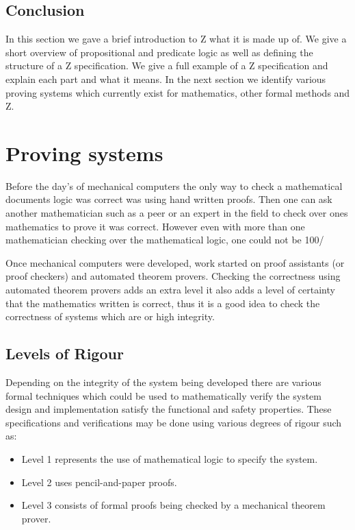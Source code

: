 \subsection{Conclusion}

In this section we gave a brief introduction to Z what it is made up of. We give a short overview of propositional and predicate logic as well as defining the structure of a Z specification. We give a full example of a Z specification and explain each part and what it means. In the next section we identify various proving systems which currently exist for mathematics, other formal methods and Z.

\section{Proving systems}

Before the day's of mechanical computers the only way to check a mathematical documents logic was correct was using hand written proofs. Then one can ask another mathematician such as a peer or an expert in the field to check over ones mathematics to prove it was correct. However even with more than one mathematician checking over the mathematical logic, one could not be 100/%

Once mechanical computers were developed, work started on proof assistants (or proof checkers) and automated theorem provers. Checking the correctness using automated theorem provers adds an extra level it also adds a level of certainty that the mathematics written is correct, thus it is a good idea to check the correctness of systems which are or high integrity.

\subsection{Levels of Rigour}

Depending on the integrity of the system being developed there are various formal techniques which could be used to mathematically verify the system design and implementation satisfy the functional and safety properties. These specifications and verifications may be done using various degrees of rigour such as:

\begin{itemize}
\item Level 1 represents the use of mathematical logic to specify the system.
\item Level 2 uses pencil-and-paper proofs.
\item Level 3 consists of formal proofs being checked by a mechanical theorem prover.
\end{itemize}

